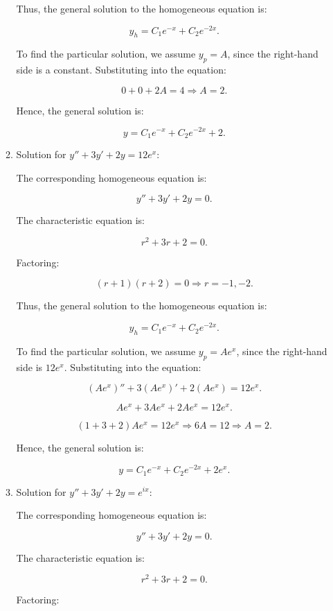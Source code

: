 \documentclass[12pt]{article}
\begin{document}
\begin{enumerate}
\begin{enumerate}
    Thus, the general solution to the homogeneous equation is:

    \[
    y_h = C_1 e^{-x} + C_2 e^{-2x}.
    \]

    To find the particular solution, we assume \( y_p = A \), since the right-hand side is a constant. Substituting into the equation:

    \[
    0 + 0 + 2A = 4 \Rightarrow A = 2.
    \]

    Hence, the general solution is:

    \[
    y = C_1 e^{-x} + C_2 e^{-2x} + 2.
    \]

    \item Solution for  \( y'' + 3y' + 2y = 12e^x \):

    The corresponding homogeneous equation is:

    \[
    y'' + 3y' + 2y = 0.
    \]

    The characteristic equation is:

    \[
    r^2 + 3r + 2 = 0.
    \]

    Factoring:

    \[
    (r+1)(r+2) = 0 \Rightarrow r = -1, -2.
    \]

    Thus, the general solution to the homogeneous equation is:

    \[
    y_h = C_1 e^{-x} + C_2 e^{-2x}.
    \]

    To find the particular solution, we assume \( y_p = A e^x \), since the right-hand side is \( 12e^x \). Substituting into the equation:

    \[
    (Ae^x)'' + 3(Ae^x)' + 2(Ae^x) = 12e^x.
    \]

    \[
    A e^x + 3A e^x + 2A e^x = 12 e^x.
    \]

    \[
    (1+3+2)A e^x = 12 e^x \Rightarrow 6A = 12 \Rightarrow A = 2.
    \]

    Hence, the general solution is:

    \[
    y = C_1 e^{-x} + C_2 e^{-2x} + 2e^x.
    \]

    \item Solution for  \( y'' + 3y' + 2y = e^{ix} \):

    The corresponding homogeneous equation is:

    \[
    y'' + 3y' + 2y = 0.
    \]

    The characteristic equation is:

    \[
    r^2 + 3r + 2 = 0.
    \]

    Factoring:


\end{enumerate}
\end{enumerate}
\end{document}

